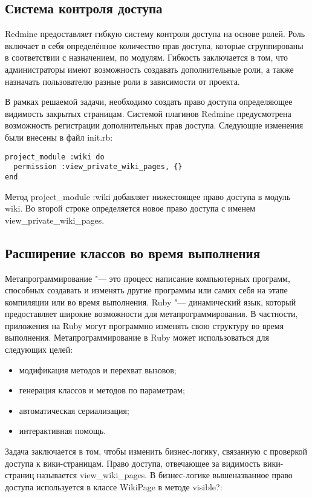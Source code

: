 \subsection{Система контроля доступа}
Redmine предоставляет гибкую систему контроля доступа на основе ролей. Роль
включает в себя определённое количество прав доступа, которые сгруппированы в
соответствии с назначением, по модулям. Гибкость заключается в том, что
администраторы имеют возможность создавать дополнительные роли, а также
назначать пользователю разные роли в зависимости от проекта.

В рамках решаемой задачи, необходимо создать право доступа определяющее
видимость закрытых страницам. Системой плагинов Redmine предусмотрена
возможность регистрации дополнительных прав доступа. Следующие изменения были
внесены в файл init.rb:

\small{
\begin{lstlisting}
project_module :wiki do
  permission :view_private_wiki_pages, {}
end
\end{lstlisting}}
Метод project\_module :wiki добавляет нижестоящее право доступа в модуль wiki.
Во второй строке определяется новое право доступа с именем
view\_private\_wiki\_pages.  


\subsection{Расширение классов во время выполнения}
\label{section:metaprogramming} 
Метапрограммирование "--- это процесс написание компьютерных программ,
способных создавать и изменять другие программы или самих себя на этапе
компиляции или во время выполнения. Ruby "--- динамический язык, который
предоставляет широкие возможности для метапрограммирования. В частности,
приложения на Ruby могут программно изменять свою структуру во время
выполнения. Метапрограммирование в Ruby может использоваться для следующих
целей:
\begin{itemize}
  \item модификация методов и перехват вызовов;
  \item генерация классов и методов по параметрам;
  \item автоматическая сериализация;
  \item интерактивная помощь.
\end{itemize}

Задача заключается в том, чтобы изменить бизнес-логику, связанную с проверкой
доступа к вики-страницам. Право доступа, отвечающее за видимость вики-страниц
называется view\_wiki\_pages. В бизнес-логике вышеназванное право доступа
используется в классе WikiPage в методе visible?:

